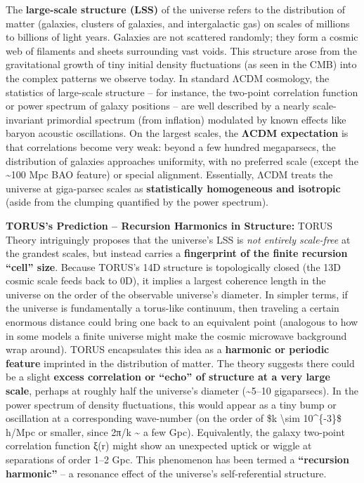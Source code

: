 The \textbf{large-scale structure (LSS)} of the universe refers to the
distribution of matter (galaxies, clusters of galaxies, and
intergalactic gas) on scales of millions to billions of light years.
Galaxies are not scattered randomly; they form a cosmic web of filaments
and sheets surrounding vast voids. This structure arose from the
gravitational growth of tiny initial density fluctuations (as seen in
the CMB) into the complex patterns we observe today. In standard ΛCDM
cosmology, the statistics of large-scale structure -- for instance, the
two-point correlation function or power spectrum of galaxy positions --
are well described by a nearly scale-invariant primordial spectrum (from
inflation) modulated by known effects like baryon acoustic oscillations.
On the largest scales, the \textbf{ΛCDM expectation} is that
correlations become very weak: beyond a few hundred megaparsecs, the
distribution of galaxies approaches uniformity, with no preferred scale
(except the \textasciitilde{}100 Mpc BAO feature) or special alignment.
Essentially, ΛCDM treats the universe at giga-parsec scales as
\textbf{statistically homogeneous and isotropic} (aside from the
clumping quantified by the power spectrum).

\textbf{TORUS's Prediction -- Recursion Harmonics in Structure:} TORUS
Theory intriguingly proposes that the universe's LSS is \emph{not
entirely scale-free} at the grandest scales, but instead carries a
\textbf{fingerprint of the finite recursion ``cell'' size}. Because
TORUS's 14D structure is topologically closed (the 13D cosmic scale
feeds back to 0D), it implies a largest coherence length in the universe
on the order of the observable universe's diameter. In simpler terms, if
the universe is fundamentally a torus-like continuum, then traveling a
certain enormous distance could bring one back to an equivalent point
(analogous to how in some models a finite universe might make the cosmic
microwave background wrap around). TORUS encapsulates this idea as a
\textbf{harmonic or periodic feature} imprinted in the distribution of
matter​. The theory suggests there could be a slight \textbf{excess
correlation or ``echo'' of structure at a very large scale}, perhaps at
roughly half the universe's diameter (\textasciitilde{}5--10
gigaparsecs)​. In the power spectrum of density fluctuations, this would
appear as a tiny bump or oscillation at a corresponding wave-number (on
the order of \$k \textbackslash{}sim 10\^{}\{-3\}\$ h/Mpc or smaller,
since 2π/k \textasciitilde{} a few Gpc). Equivalently, the galaxy
two-point correlation function ξ(r) might show an unexpected uptick or
wiggle at separations of order 1--2 Gpc​. This phenomenon has been
termed a \textbf{``recursion harmonic''} -- a resonance effect of the
universe's self-referential structure.

